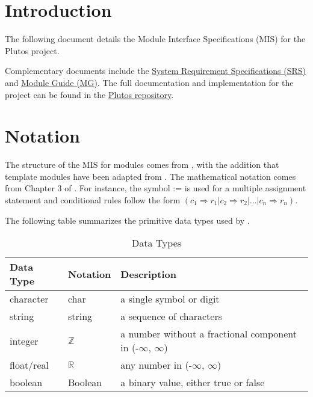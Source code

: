 \documentclass[12pt, titlepage]{article}
\begin{document}
\newpage

\tableofcontents

\listoftables

\newpage


\section{Introduction}

The following document details the Module Interface Specifications (MIS) for the
Plutos project.

Complementary documents include the
\href{https://github.com/PlutosCapstone/Plutos/blob/main/docs/SRS/SRS.pdf}{System
Requirement Specifications (SRS)} and
\href{https://github.com/PlutosCapstone/Plutos/blob/main/docs/Design/SoftArchitecture/MG.pdf}{Module
Guide (MG)}. The full documentation and implementation for the project can be
found in the \href{https://github.com/PlutosCapstone/Plutos/tree/main}{Plutos
repository}.

\section{Notation}

The structure of the MIS for modules comes from \citet{HoffmanAndStrooper1995},
with the addition that template modules have been adapted from
\cite{GhezziEtAl2003}.  The mathematical notation comes from Chapter 3 of
\citet{HoffmanAndStrooper1995}.  For instance, the symbol := is used for a
multiple assignment statement and conditional rules follow the form $(c_1
\Rightarrow r_1 | c_2 \Rightarrow r_2 | ... | c_n \Rightarrow r_n )$.

The following table summarizes the primitive data types used by \progname. 

\renewcommand{\arraystretch}{1.2}
\begin{table}[H]
\caption{Data Types}
\centering
\noindent 
\begin{tabular}{l l p{7.5cm}} 
\toprule 
\textbf{Data Type} & \textbf{Notation} & \textbf{Description}\\ 
\midrule
character & char & a single symbol or digit\\
string & string & a sequence of characters\\
integer & $\mathbb{Z}$ & a number without a fractional component in (-$\infty$, $\infty$) \\
float/real & $\mathbb{R}$ & any number in (-$\infty$, $\infty$)\\
boolean & Boolean & a binary value, either true or false\\
\bottomrule
\end{tabular} 
\end{table}
\end{document}
